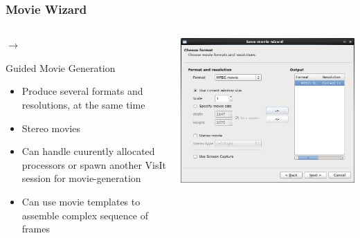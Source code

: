 \begin{frame}
\frametitle{Movie Wizard}
\begin{columns}
\begin{column}{5.75cm}
	\textcolor{DarkBlue}{}
	 $\rightarrow$ 

        \begin{block}{Guided Movie Generation}
        \begin{itemize}
        \item Produce several formats and resolutions, at the same time
	\item Stereo movies
	\item Can handle cuurently allocated processors or spawn another VisIt session for movie-generation
	\item Can use movie templates to assemble complex sequence of frames
        \end{itemize}
        \end{block}
\end{column}
\begin{column}{5cm}
	\includegraphics[width=\columnwidth]{figs/visit-guis/visit_movieWizard}


\end{column}
\end{columns}
\end{frame}
